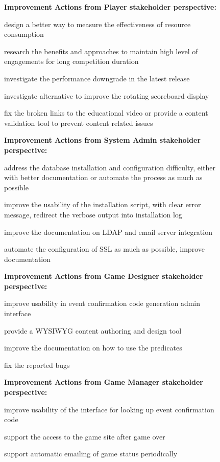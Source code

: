 \begin{figure}[ht!]
\begin{mybox}

\textbf{Improvement Actions from Player stakeholder perspective:}
\begin{compactenum}
\item design a better way to measure the effectiveness of resource consumption 
\item research the benefits and approaches to maintain high level of engagements for long competition duration
\item investigate the performance downgrade in the latest release
\item investigate alternative to improve the rotating scoreboard display
\item fix the broken links to the educational video or provide a content validation tool to prevent content related issues
\end{compactenum}

\textbf{Improvement Actions from System Admin stakeholder perspective:}
\begin{compactenum}
\item address the database installation and configuration difficulty, either with better documentation or automate the process as much as possible
\item improve the usability of the installation script, with clear error message, redirect the verbose output into installation log
\item improve the documentation on LDAP and email server integration
\item automate the configuration of SSL as much as possible, improve documentation
\end{compactenum}

\textbf{Improvement Actions from Game Designer stakeholder perspective:}
\begin{compactenum}
\item improve usability in event confirmation code generation admin interface
\item provide a WYSIWYG content authoring and design tool
\item improve the documentation on how to use the predicates
\item fix the reported bugs 
\end{compactenum}

\textbf{Improvement Actions from Game Manager stakeholder perspective:}
\begin{compactenum}
\item improve usability of the interface for looking up event confirmation code
\item support the access to the game site after game over
\item support automatic emailing of game status periodically
\end{compactenum}


\end{mybox}
\end{figure}
